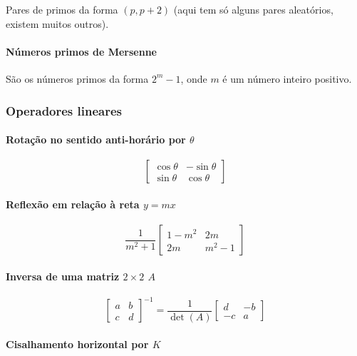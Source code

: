 Pares de primos da forma $(p, p+2)$ (aqui tem só alguns pares aleatórios, existem muitos outros).

\paragraph{Números primos de Mersenne}

São os números primos da forma $2^m - 1$, onde $m$ é um número inteiro positivo.

\subsubsection{Operadores lineares}

\paragraph{Rotação no sentido anti-horário por $\theta$}

\[
\begin{bmatrix}
\cos \theta & -\sin \theta \\
\sin \theta & \cos \theta
\end{bmatrix}
\]

\paragraph{Reflexão em relação à reta $y = mx$}

\[
\frac{1}{m^2 + 1}
\begin{bmatrix}
1 - m^2 & 2m \\
2m & m^2 - 1
\end{bmatrix}
\]

\paragraph{Inversa de uma matriz $2 \times 2$ $A$}

\[
\begin{bmatrix}
a & b \\
c & d
\end{bmatrix}^{-1}
= \frac{1}{\det(A)}
\begin{bmatrix}
d & -b \\
-c & a
\end{bmatrix}
\]

\paragraph{Cisalhamento horizontal por $K$}

